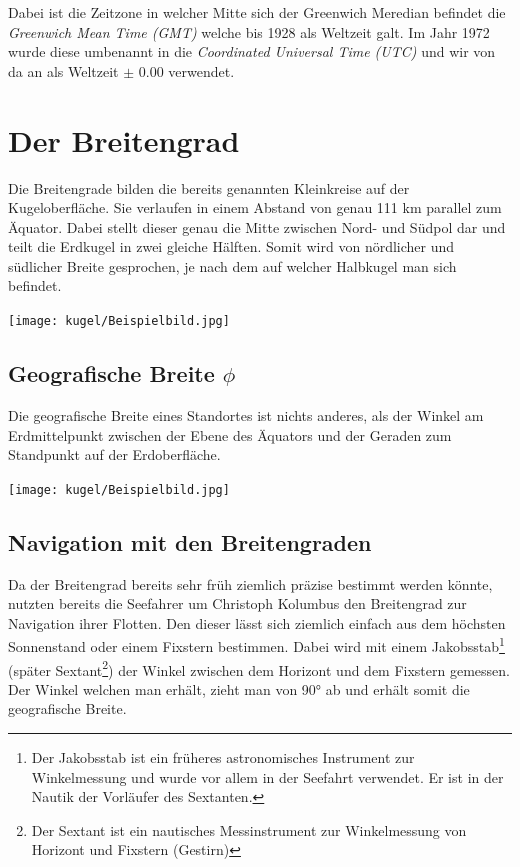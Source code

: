\begin{refsection}
Dabei ist die Zeitzone in welcher Mitte sich der Greenwich Meredian befindet die \textit{Greenwich Mean Time (GMT)} welche bis 1928 als Weltzeit galt. Im Jahr 1972 wurde diese umbenannt in die \textit{Coordinated Universal Time (UTC)} und wir von da an als Weltzeit $\pm$ 0.00 verwendet.


\section{Der Breitengrad}
Die Breitengrade bilden die bereits genannten Kleinkreise auf der Kugeloberfläche. Sie verlaufen in einem Abstand von genau 111 km parallel zum Äquator. Dabei stellt  dieser genau die Mitte zwischen Nord- und Südpol dar und teilt die Erdkugel in zwei gleiche Hälften. Somit wird von nördlicher und südlicher Breite gesprochen, je nach dem auf welcher Halbkugel man sich befindet.

\begin{center}
        \texttt{[image: kugel/Beispielbild.jpg]}
\end{center}


\subsection{Geografische Breite $\phi$}
\begin{definition}
Die geografische Breite eines Standortes ist nichts anderes, als der Winkel am Erdmittelpunkt zwischen der Ebene des Äquators und der Geraden zum Standpunkt auf der Erdoberfläche.
\end{definition}

\begin{center}
        \texttt{[image: kugel/Beispielbild.jpg]}
\end{center}


\subsection{Navigation mit den Breitengraden}
Da der Breitengrad bereits sehr früh ziemlich präzise bestimmt werden könnte, nutzten bereits die Seefahrer um Christoph Kolumbus den Breitengrad zur Navigation ihrer Flotten.
Den dieser lässt sich ziemlich einfach aus dem höchsten Sonnenstand oder einem Fixstern bestimmen. Dabei wird mit einem Jakobsstab\footnote{%
Der Jakobsstab ist ein früheres astronomisches Instrument zur Winkelmessung und wurde vor allem in der Seefahrt verwendet. Er ist in der Nautik der Vorläufer des Sextanten.} (später Sextant\footnote{%
Der Sextant ist ein nautisches Messinstrument zur Winkelmessung von Horizont und Fixstern (Gestirn)}) der Winkel zwischen dem Horizont und dem Fixstern gemessen. Der Winkel welchen man erhält, zieht man von 90° ab und erhält somit die geografische Breite. \\


\end{refsection}
